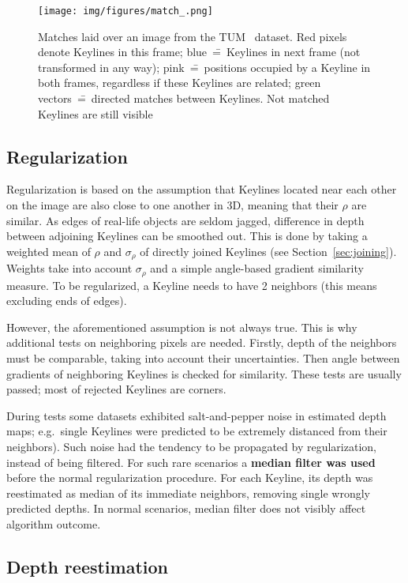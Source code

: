 \begin{figure}[ht]
	\centering\texttt{[image: img/figures/match\_.png]}
	\caption{ Matches laid over an image from the TUM~\cite{tum} dataset. Red pixels denote Keylines in this frame; blue~\==~Keylines in next frame (not transformed in any way); pink~\==~positions occupied by a Keyline in both frames, regardless if these Keylines are related; green vectors~\==~directed matches between Keylines. Not matched Keylines are still visible }
	\label{fig:match}
\end{figure}

\subsection{Regularization}

Regularization is based on the assumption that Keylines located near each other on the image are also close to one another in 3D, meaning that their $\rho$ are similar. As edges of real-life objects are seldom jagged, difference in depth between adjoining Keylines can be smoothed out. This is done by taking a weighted mean of $\rho$ and $\sigma_{\rho}$ of directly joined Keylines (see Section~\ref{sec:joining}). Weights take into account $\sigma_{\rho}$ and a simple angle-based gradient similarity measure. To be regularized, a Keyline needs to have 2 neighbors (this means excluding ends of edges).

However, the aforementioned assumption is not always true. This is why additional tests on neighboring pixels are needed. Firstly, depth of the neighbors must be comparable, taking into account their uncertainties. Then angle between gradients of neighboring Keylines is checked for similarity. These tests are usually passed; most of rejected Keylines are corners.

During tests some datasets exhibited salt-and-pepper noise in estimated depth maps; e.g.~single Keylines were predicted to be extremely distanced from their neighbors). Such noise had the tendency to be propagated by regularization, instead of being filtered. For such rare scenarios a \textbf{median filter was used} before the normal regularization procedure. For each Keyline, its depth was reestimated as median of its immediate neighbors, removing single wrongly predicted depths. In normal scenarios, median filter does not visibly affect algorithm outcome.

\subsection{Depth reestimation}

